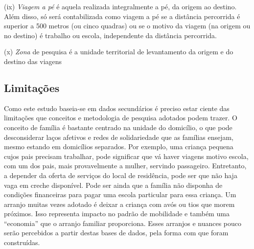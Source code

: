 \begin{compactitem}[]
\item (ix) \emph{Viagem a pé} é aquela realizada integralmente a pé, da origem ao destino. Além disso, só será contabilizada como viagem a pé se a distância percorrida é superior a 500 metros (ou cinco quadras) ou se o motivo da viagem (na origem ou no destino) é trabalho ou escola, independente da distância percorrida.

\item (x) \emph{Zona} de pesquisa é a unidade territorial de levantamento da origem e do destino das viagens
\end{compactitem}

\subsection{Limitações}\label{subsec:limitacoes}

Como este estudo baseia-se em dados secundários é preciso estar ciente das limitações que conceitos e metodologia de pesquisa adotados podem trazer. O conceito de família é bastante centrado na unidade do domicílio, o que pode desconsiderar laços afetivos e redes de solidariedade que as famílias ensejam, mesmo estando em domicílios separados. Por exemplo, uma criança pequena cujos pais precisam trabalhar, pode significar que vá haver viagens motivo escola, com um dos pais, mais provavelmente a mulher, servindo passageiro. Entretanto, a depender da oferta de serviços do local de residência, pode ser que não haja vaga em creche disponível. Pode ser ainda que a família não disponha de  condições financeiras para pagar uma escola particular para essa criança. Um arranjo muitas vezes adotado é deixar a criança com avós ou tios que morem próximos. Isso representa impacto no padrão de mobilidade e também uma ``economia'' que o arranjo familiar proporciona. Esses arranjos e nuances pouco serão percebidos a partir destas bases de dados, pela forma com que foram construídas.

